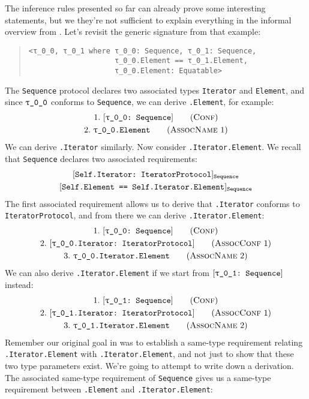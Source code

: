 \documentclass[../generics]{subfiles}
\begin{document}
\begin{example}\label{motivating derived equiv}
The inference rules presented so far can already prove some interesting statements, but we they're not sufficient to explain everything in the informal overview from . Let's revisit the generic signature from that example:
\begin{quote}
\begin{verbatim}
<τ_0_0, τ_0_1 where τ_0_0: Sequence, τ_0_1: Sequence,
                    τ_0_0.Element == τ_0_1.Element,
                    τ_0_0.Element: Equatable>
\end{verbatim}
\end{quote}
The \texttt{Sequence} protocol declares two associated types \texttt{Iterator} and \texttt{Element}, and since $\rT$ conforms to \texttt{Sequence}, we can derive \texttt{\rT.Element}, for example:
\begin{gather*}
\ConfStep{\rT}{Sequence}{1}\\
\AssocNameStep{1}{\rT.Element}{2}
\end{gather*}
We can derive \texttt{\rT.Iterator} similarly. Now consider \texttt{\rT.Iterator.Element}. We recall that \texttt{Sequence} declares two associated requirements:
\begin{gather*}
\ConfReq{Self.Iterator}{IteratorProtocol}_\texttt{Sequence}\\
\SameReq{Self.Element}{Self.Iterator.Element}_\texttt{Sequence}
\end{gather*}
The first associated requirement allows us to derive that \texttt{\rT.Iterator} conforms to \texttt{IteratorProtocol}, and from there we can derive \texttt{\rT.Iterator.Element}:
\begin{gather*}
\ConfStep{\rT}{Sequence}{1}\\
\AssocConfStep{1}{\rT.Iterator}{IteratorProtocol}{2}\\
\AssocNameStep{2}{\rT.Iterator.Element}{3}
\end{gather*}
We can also derive \texttt{\rU.Iterator.Element} if we start from $\ConfReq{\rU}{Sequence}$ instead:
\begin{gather*}
\ConfStep{\rU}{Sequence}{1}\\
\AssocConfStep{1}{\rU.Iterator}{IteratorProtocol}{2}\\
\AssocNameStep{2}{\rU.Iterator.Element}{3}
\end{gather*}
Remember our original goal in  was to establish a same-type requirement relating \texttt{\rT.Iterator.Element} with \texttt{\rU.Iterator.Element}, and not just to show that these two type parameters exist. We're going to attempt to write down a derivation. The associated same-type requirement of \texttt{Sequence} gives us a same-type requirement between \texttt{\rT.Element} and \texttt{\rT.Iterator.Element}:

\end{example}
\end{document}

